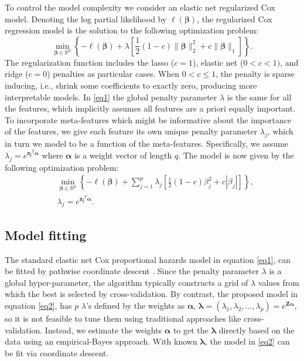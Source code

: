 To control the model complexity we consider an elastic net regularized Cox model. Denoting the log partial likelihood by $\ell(\bm{\beta})$, the regularized Cox regression model is the solution to the following optimization problem:
\begin{equation} \label{eq1}
    \min_{\bm{\beta}\in \mathbb{R}^p} \left\{-\ell(\bm{\beta}) + \lambda\left[\frac{1}{2}(1-c)\|\bm{\beta}\|_2^2 + c\|\bm{\beta}\|_1\right]\right\}.
\end{equation}
The regularization function includes the lasso ($c=1$), elastic net ($0 < c <1)$, and ridge ($c=0$) penalties as particular cases. When $ 0<c \leq 1$, the penalty is sparse inducing, i.e.,  shrink some coefficients to exactly zero, producing more interpretable models. In \eqref{eq1} the global penalty parameter $\lambda$ is the same  for all the features, which implicitly assumes all features are a priori equally important.  To incorporate meta-features which might be informative about the importance of the features, we give each feature its own unique penalty parameter $\lambda_j$, which in turn we model to be a function of the meta-features. Specifically,  we assume $\lambda_j=e^{\bm{z_j}^T \bm{\alpha}}$ where $\bm{\alpha}$ is a weight vector of length $q$. The model is now given by the following optimization problem: 
\begin{equation} \label{eq2}
\begin{aligned}
    &\min_{\bm{\beta}\in \mathbb{R}^p} \left\{-\ell(\bm{\beta}) + \sum_{j=1}^p \lambda_j\left[\frac{1}{2}(1-c)\beta_j^2 + c|\beta_j|\right]\right\}, \\
    &\lambda_j = e^{\bm{z_j}^T \bm{\alpha}}.
\end{aligned}
\end{equation}

\subsection{Model fitting}
The standard elastic net Cox proportional hazards model in equation \eqref{eq1}, can be fitted by pathwise coordinate descent \citep{simon2011regularization}. Since the  penalty parameter $\lambda$ is a global hyper-parameter, the algorithm typically constructs a grid of $\lambda$ values from which the best is selected by cross-validation. By contrast, the proposed model in equation \eqref{eq2}, has $p$ $\lambda$'s defined by the weights as $\bm{\alpha}$, $\bm{\lambda} = (\lambda_1,\lambda_2,\dots,\lambda_p) = e^{\bm{Z\alpha}}$, so it is not feasible to tune them using traditional approaches like cross-validation. Instead, we estimate the weights $\bm{\alpha}$ to get the  $\bm{\lambda}$ directly based on the data using an empirical-Bayes approach. With known $\bm{\lambda}$, the model in \eqref{eq2} can be fit via coordinate descent.

